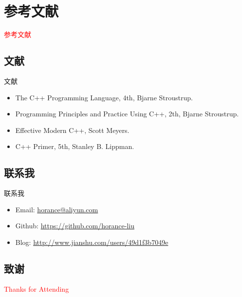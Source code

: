 \section{参考文献}
\label{sec:reference}

\begin{frame}
  \begin{center}
    \Huge{\textcolor{red}{参考文献}}
  \end{center}
\end{frame}

\subsection{文献}

\begin{frame}{文献}
    \begin{itemize}
    \item \alert{The C++ Programming Language, 4th}, Bjarne Stroustrup.
    \item \alert{Programming Principles and Practice Using C++, 2th}, Bjarne Stroustrup.
    \item \alert{Effective Modern C++}, Scott Meyers.
    \item \alert{C++ Primer, 5th}, Stanley B. Lippman.
    \end{itemize}
\end{frame}

\subsection{联系我}

\begin{frame}{联系我}
    \begin{itemize}
    \item \alert{Email}: \href{horance@aliyun.com}{horance@aliyun.com}
    \item \alert{Github}: \href{https://github.com/horance-liu}{https://github.com/horance-liu} 
    \item \alert{Blog}: \href{http://www.jianshu.com/users/49d1f3b7049e}{http://www.jianshu.com/users/49d1f3b7049e}
    \end{itemize}
\end{frame}

\subsection{致谢}

\begin{frame}{}
  \begin{center}
    \Huge{\textcolor{red}{Thanks for Attending}}
  \end{center}
\end{frame}